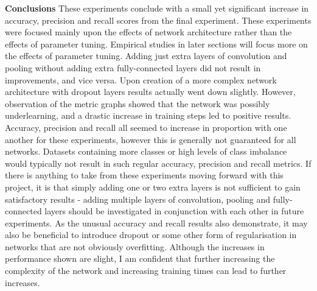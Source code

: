 \documentclass[12pt]{report}
\begin{document}
\begin{flushleft}
\vspace{0.5cm}
\textbf{Conclusions}
\linebreak
These experiments conclude with a small yet significant increase in accuracy, precision and recall scores from the final experiment. These experiments were focused mainly upon the effects of network architecture rather than the effects of parameter tuning. Empirical studies in later sections will focus more on the effects of parameter tuning. Adding just extra layers of convolution and pooling without adding extra fully-connected layers did not result in improvements, and vice versa. Upon creation of a more complex network architecture with dropout layers results actually went down slightly. However, observation of the metric graphs showed that the network was possibly underlearning, and a drastic increase in training steps led to positive results. Accuracy, precision and recall all seemed to increase in proportion with one another for these experiments, however this is generally not guaranteed for all networks. Datasets containing more classes or high levels of class imbalance would typically not result in such regular accuracy, precision and recall metrics. If there is anything to take from these experiments moving forward with this project, it is that simply adding one or two extra layers is not sufficient to gain satisfactory results - adding multiple layers of convolution, pooling and fully-connected layers should be investigated in conjunction with each other in future experiments. As the unusual accuracy and recall results also demonstrate, it may also be beneficial to introduce dropout or some other form of regularisation in networks that are not obviously overfitting. Although the increases in performance shown are slight, I am confident that further increasing the complexity of the network and increasing training times can lead to further increases.
\end{flushleft}

\newpage
\end{document}
